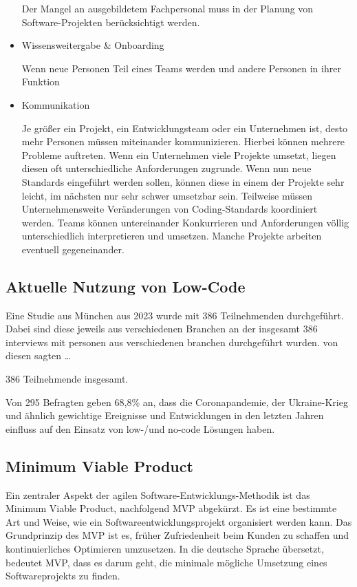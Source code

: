 \documentclass[acmtog, language=ngerman]{acmart}
\begin{document}
\begin{itemize}
Der Mangel an ausgebildetem Fachpersonal muss in der Planung von Software-Projekten berücksichtigt werden.

\item Wissensweitergabe \& Onboarding

Wenn neue Personen Teil eines Teams werden und andere Personen in ihrer Funktion 

\item Kommunikation

Je größer ein Projekt, ein Entwicklungsteam oder ein Unternehmen ist, desto mehr Personen müssen miteinander kommunizieren. Hierbei können mehrere Probleme auftreten.
Wenn ein Unternehmen viele Projekte umsetzt, liegen diesen oft unterschiedliche Anforderungen zugrunde. Wenn nun neue Standards eingeführt werden sollen, können diese in einem der Projekte sehr leicht, im nächsten nur sehr schwer umsetzbar sein. 
Teilweise müssen Unternehmensweite Veränderungen von Coding-Standards koordiniert werden. Teams können untereinander Konkurrieren und Anforderungen völlig unterschiedlich interpretieren und umsetzen. Manche Projekte arbeiten eventuell gegeneinander. 
\end{itemize}

\subsection{Aktuelle Nutzung von Low-Code}
Eine Studie aus München aus 2023 wurde mit 386 Teilnehmenden durchgeführt. \cite{studie_low_code}  Dabei sind diese jeweils aus verschiedenen Branchen 
an der insgesamt 386 interviews mit personen aus verschiedenen branchen durchgeführt wurden. von diesen sagten …

386 Teilnehmende insgesamt. 

Von 295 Befragten geben 68,8\% an, dass die Coronapandemie, der Ukraine-Krieg und ähnlich gewichtige Ereignisse und Entwicklungen in den letzten Jahren einfluss auf den Einsatz von low-/und no-code Lösungen haben.


\subsection{Minimum Viable Product}
Ein zentraler Aspekt der agilen Software-Entwicklungs-Methodik ist das Minimum Viable Product, nachfolgend MVP abgekürzt. Es ist eine bestimmte Art und Weise, wie ein Softwareentwicklungsprojekt organisiert werden kann.
Das Grundprinzip des MVP ist es, früher Zufriedenheit beim Kunden zu schaffen und kontinuierliches Optimieren umzusetzen. In die deutsche Sprache übersetzt, bedeutet MVP, dass es darum geht, die minimale mögliche Umsetzung eines Softwareprojekts zu finden.
\end{document}
